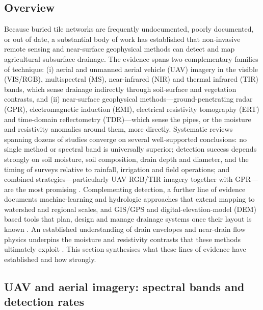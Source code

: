 \subsection{Overview}

Because buried tile networks are frequently undocumented, poorly documented, or out of date, a substantial body of work has established that non-invasive remote sensing and near-surface geophysical methods can detect and map agricultural subsurface drainage. The evidence spans two complementary families of technique: (i) aerial and unmanned aerial vehicle (UAV) imagery in the visible (VIS/RGB), multispectral (MS), near-infrared (NIR) and thermal infrared (TIR) bands, which sense drainage indirectly through soil-surface and vegetation contrasts, and (ii) near-surface geophysical methods---ground-penetrating radar (GPR), electromagnetic induction (EMI), electrical resistivity tomography (ERT) and time-domain reflectometry (TDR)---which sense the pipes, or the moisture and resistivity anomalies around them, more directly. Systematic reviews spanning dozens of studies converge on several well-supported conclusions: no single method or spectral band is universally superior; detection success depends strongly on soil moisture, soil composition, drain depth and diameter, and the timing of surveys relative to rainfall, irrigation and field operations; and combined strategies---particularly UAV RGB/TIR imagery together with GPR---are the most promising \parencite{Carlsen2024,Wienken2024,Koganti2021}. Complementing detection, a further line of evidence documents machine-learning and hydrologic approaches that extend mapping to watershed and regional scales, and GIS/GPS and digital-elevation-model (DEM) based tools that plan, design and manage drainage systems once their layout is known \parencite{Cho2019,Yimer2023,Shedekar2018,Falasy2024,Falasy2025,Falasy2025b}. An established understanding of drain envelopes and near-drain flow physics underpins the moisture and resistivity contrasts that these methods ultimately exploit \parencite{Stuyt2006}. This section synthesises what these lines of evidence have established and how strongly.

\subsection{UAV and aerial imagery: spectral bands and detection rates}

